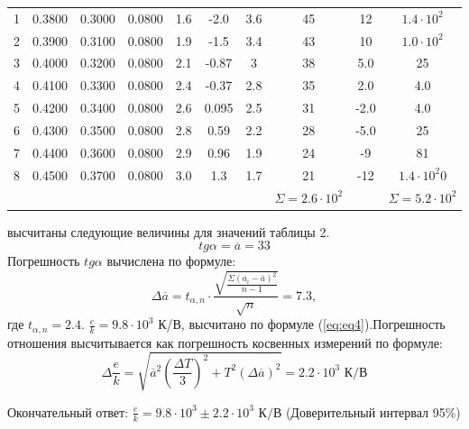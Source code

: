 \begin{center}
\begin{table}[H]
\begin{tabular}{|c|c|c|c|c|c|c|c|c|c|}
\begin{minipage}{21mm}
\end{minipage}\\
\hline
1 &  0.3800  &  0.3000  & 0.0800 & 1.6& -2.0&3.6 & 45 &12 & $1.4\cdot 10^2$\\
2 &  0.3900  &  0.3100  &  0.0800 & 1.9& -1.5&3.4 &43 &10 &$1.0\cdot 10^2$\\
3 &  0.4000  &  0.3200  & 0.0800  & 2.1& -0.87&3 &38&5.0 &25\\
4 & 0.4100  &  0.3300 &  0.0800 & 2.4& -0.37&2.8  &35 &2.0 &4.0\\
5 & 0.4200  &  0.3400  &  0.0800 &  2.6&0.095 &2.5 &31 &-2.0 &4.0  \\
6 & 0.4300  &  0.3500  &  0.0800 & 2.8&0.59 &2.2 &28 &-5.0 &25 \\
7 & 0.4400  &  0.3600  &  0.0800 & 2.9&0.96 &1.9 &24 &-9 & 81 \\
8 & 0.4500  &  0.3700  &  0.0800 & 3.0& 1.3 &1.7 &21 &-12 &$1.4\cdot 10^2$0  \\
 &   &    &   & &  & & $\Sigma=2.6\cdot 10^2$& & $\Sigma=5.2\cdot 10^2$ \\

\hline
\end{tabular}
\end{table}
\end{center}
 высчитаны следующие величины для значений таблицы 2.
\begin{equation}
    tg{\alpha}=\overline{a}=33
\end{equation}
Погрешность $tg{\alpha}$ вычислена по формуле:
\begin{equation}
    \Delta\overline{a}=t_{\alpha,n}\cdot\frac{\sqrt{\frac{\Sigma(a_i-\overline{a})^2}{{n-1}}}}{\sqrt{n}}=7.3,
\end{equation}
где $t_{\alpha,n}=2.4$.
 $\frac{e}{k}=9.8\cdot10^3$ К/В, высчитано по формуле (\ref{eq:eq4}).Погрешность отношения высчитывается как погрешность косвенных измерений по формуле:
\begin{equation}
    \Delta\frac{e}{k}=\sqrt{\overline{a}^2(\frac{\Delta T}{3})^2+T^2(\Delta\overline{a})^2}=2.2\cdot10^3\text{ К/В}
\end{equation}
\par Окончательный ответ: $\frac{e}{k}=9.8\cdot10^3\pm2.2\cdot10^3\text{ К/В}$ (Доверительный интервал 95\%)

